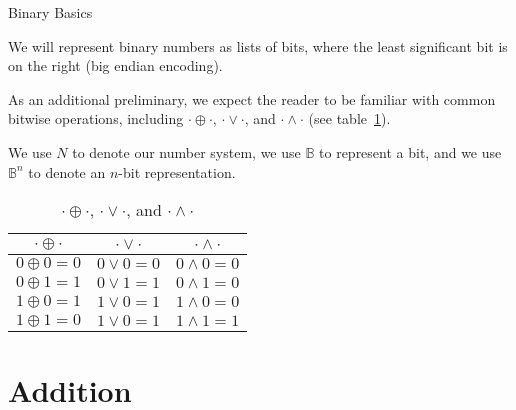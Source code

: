 \documentclass[aspectratio=169]{beamer}
\begin{document}
\begin{frame}{Binary Basics}

We will represent binary numbers as lists of bits, where the least significant bit is on the right (big endian encoding).

As an additional preliminary, we expect the reader to be familiar with common bitwise operations, including $\cdot \oplus \cdot$, $\cdot \lor \cdot$, and $\cdot \land \cdot$ (see table~\ref{table:bitops}).
\begin{notn}
  We use $N$ to denote our number system, we use $\mathbb{B}$ to represent a bit,  and we use $\mathbb{B}^{n}$ to denote an $n$-bit representation.
\end{notn}
\begin{table}[h]
\centering
\begin{tabular}{||c c c||}
 \hline
 $\cdot \oplus \cdot$ & $\cdot \lor \cdot$ & $\cdot \land \cdot$  \\ [0.5ex]
 \hline\hline
 $0 \oplus 0 = 0$ & $0 \lor 0 = 0$ & $0 \land 0 = 0$ \\
 $0 \oplus 1 = 1$ & $0 \lor 1 = 1$ & $0 \land 1 = 0$ \\
 $1 \oplus 0 = 1$ & $1 \lor 0 = 1$ & $1 \land 0 = 0$ \\
 $1 \oplus 1 = 0$ & $1 \lor 0 = 1$ & $1 \land 1 = 1$ \\
 \hline
\end{tabular}
\caption{$\cdot \oplus \cdot$, $\cdot \lor \cdot$, and $\cdot \land \cdot$}
\label{table:bitops}
\end{table}



\end{frame}

\section{Addition}
\end{document}
